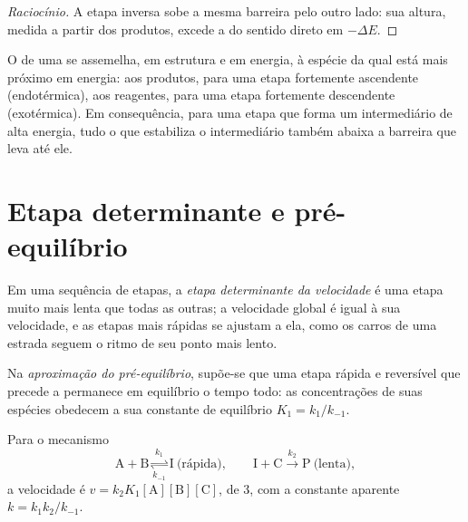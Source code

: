 \begin{proof}[Raciocínio]
A etapa inversa sobe a mesma barreira pelo outro lado: sua altura,
medida a partir dos produtos, excede a do sentido direto em $-\Delta E$.
\end{proof}

\begin{proposition}\label{prop:b1:elementary-steps:hammond}
O  de uma  se assemelha, em estrutura
e em energia, à espécie da qual está mais próximo em energia: aos
produtos, para uma etapa fortemente ascendente (endotérmica), aos
reagentes, para uma etapa fortemente descendente (exotérmica). Em
consequência, para uma etapa que forma um intermediário de alta energia,
tudo o que estabiliza o intermediário também abaixa a barreira que leva
até ele.
\end{proposition}
\admitted

\section{Etapa determinante e pré-equilíbrio}

\begin{definition}\label{def:b1:elementary-steps:rds}
Em uma sequência de etapas, a \emph{etapa determinante da
velocidade} é uma etapa muito mais
lenta que todas as outras; a velocidade global é igual à sua velocidade,
e as etapas mais rápidas se ajustam a ela, como os carros de uma
estrada seguem o ritmo de seu ponto mais lento.
\end{definition}

\begin{definition}\label{def:b1:elementary-steps:pre-equilibrium}
Na \emph{aproximação do pré-equilíbrio},
supõe-se que uma etapa rápida e reversível que precede a  permanece em equilíbrio o tempo todo: as concentrações de
suas espécies obedecem a sua constante de equilíbrio $K_1 = k_1/k_{-1}$.
\end{definition}

\begin{proposition}\label{prop:b1:elementary-steps:pre-equilibrium-law}
Para o mecanismo
\[
  \mathrm{A} + \mathrm{B} \underset{k_{-1}}{\overset{k_1}{\rightleftharpoons}} \mathrm{I}
  \ \text{(rápida)}, \qquad
  \mathrm{I} + \mathrm{C} \xrightarrow{\ k_2\ } \mathrm{P} \ \text{(lenta)},
\]
a velocidade é $v = k_2K_1[\mathrm{A}][\mathrm{B}][\mathrm{C}]$, de  3, com a constante aparente $k = k_1k_2/k_{-1}$.
\end{proposition}

